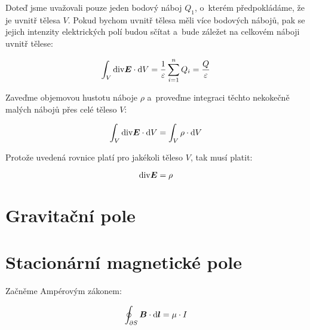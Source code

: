 
Doteď jsme uvažovali pouze jeden bodový náboj \(Q_1\), o~kterém předpokládáme, že je uvnitř tělesa \(V\). Pokud bychom uvnitř tělesa měli více bodových nábojů, pak se jejich intenzity elektrických polí budou sčítat a~bude záležet na celkovém náboji uvnitř tělese: 

\begin{equation}
\int_{V} \mathrm{div} \boldsymbol{E} \cdot \mathrm{d}V = \frac{1}{\varepsilon} \sum_{i=1}^n Q_i = \frac{Q}{\varepsilon}
\end{equation}

Zaveďme objemovou hustotu náboje \(\rho\) a~proveďme integraci těchto nekokečně malých nábojů přes celé těleso \(V\):

\begin{equation}
\int_{V} \mathrm{div} \boldsymbol{E} \cdot \mathrm{d}V = \int_{V} \rho \cdot \mathrm{d}V
\end{equation}

Protože uvedená rovnice platí pro jakékoli těleso \(V\), tak musí platit:

\begin{equation}
\mathrm{div} \boldsymbol{E} = \rho
\end{equation}



\section{Gravitační pole}

\section{Stacionární magnetické pole}

Začněme Ampérovým zákonem:

\begin{equation}
\oint_{\partial S} \boldsymbol{B} \cdot \mathrm{d}\boldsymbol{l} = \mu \cdot I
\end{equation}

